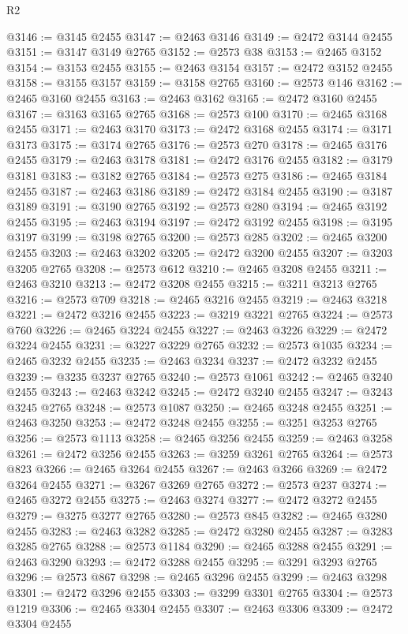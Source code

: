 \begin{lexlean}{R2}
\begin{coremodule}
@3146 := @3145 @2455
@3147 := @2463 @3146
@3149 := @2472 @3144 @2455
@3151 := @3147 @3149 @2765
@3152 := @2573 @38
@3153 := @2465 @3152
@3154 := @3153 @2455
@3155 := @2463 @3154
@3157 := @2472 @3152 @2455
@3158 := @3155 @3157
@3159 := @3158 @2765
@3160 := @2573 @146
@3162 := @2465 @3160 @2455
@3163 := @2463 @3162
@3165 := @2472 @3160 @2455
@3167 := @3163 @3165 @2765
@3168 := @2573 @100
@3170 := @2465 @3168 @2455
@3171 := @2463 @3170
@3173 := @2472 @3168 @2455
@3174 := @3171 @3173
@3175 := @3174 @2765
@3176 := @2573 @270
@3178 := @2465 @3176 @2455
@3179 := @2463 @3178
@3181 := @2472 @3176 @2455
@3182 := @3179 @3181
@3183 := @3182 @2765
@3184 := @2573 @275
@3186 := @2465 @3184 @2455
@3187 := @2463 @3186
@3189 := @2472 @3184 @2455
@3190 := @3187 @3189
@3191 := @3190 @2765
@3192 := @2573 @280
@3194 := @2465 @3192 @2455
@3195 := @2463 @3194
@3197 := @2472 @3192 @2455
@3198 := @3195 @3197
@3199 := @3198 @2765
@3200 := @2573 @285
@3202 := @2465 @3200 @2455
@3203 := @2463 @3202
@3205 := @2472 @3200 @2455
@3207 := @3203 @3205 @2765
@3208 := @2573 @612
@3210 := @2465 @3208 @2455
@3211 := @2463 @3210
@3213 := @2472 @3208 @2455
@3215 := @3211 @3213 @2765
@3216 := @2573 @709
@3218 := @2465 @3216 @2455
@3219 := @2463 @3218
@3221 := @2472 @3216 @2455
@3223 := @3219 @3221 @2765
@3224 := @2573 @760
@3226 := @2465 @3224 @2455
@3227 := @2463 @3226
@3229 := @2472 @3224 @2455
@3231 := @3227 @3229 @2765
@3232 := @2573 @1035
@3234 := @2465 @3232 @2455
@3235 := @2463 @3234
@3237 := @2472 @3232 @2455
@3239 := @3235 @3237 @2765
@3240 := @2573 @1061
@3242 := @2465 @3240 @2455
@3243 := @2463 @3242
@3245 := @2472 @3240 @2455
@3247 := @3243 @3245 @2765
@3248 := @2573 @1087
@3250 := @2465 @3248 @2455
@3251 := @2463 @3250
@3253 := @2472 @3248 @2455
@3255 := @3251 @3253 @2765
@3256 := @2573 @1113
@3258 := @2465 @3256 @2455
@3259 := @2463 @3258
@3261 := @2472 @3256 @2455
@3263 := @3259 @3261 @2765
@3264 := @2573 @823
@3266 := @2465 @3264 @2455
@3267 := @2463 @3266
@3269 := @2472 @3264 @2455
@3271 := @3267 @3269 @2765
@3272 := @2573 @237
@3274 := @2465 @3272 @2455
@3275 := @2463 @3274
@3277 := @2472 @3272 @2455
@3279 := @3275 @3277 @2765
@3280 := @2573 @845
@3282 := @2465 @3280 @2455
@3283 := @2463 @3282
@3285 := @2472 @3280 @2455
@3287 := @3283 @3285 @2765
@3288 := @2573 @1184
@3290 := @2465 @3288 @2455
@3291 := @2463 @3290
@3293 := @2472 @3288 @2455
@3295 := @3291 @3293 @2765
@3296 := @2573 @867
@3298 := @2465 @3296 @2455
@3299 := @2463 @3298
@3301 := @2472 @3296 @2455
@3303 := @3299 @3301 @2765
@3304 := @2573 @1219
@3306 := @2465 @3304 @2455
@3307 := @2463 @3306
@3309 := @2472 @3304 @2455

\end{coremodule}
\end{lexlean}
